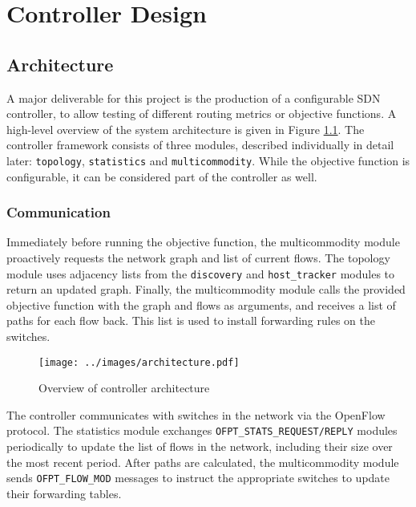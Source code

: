 \chapter{Controller Design}

\section{Architecture}
A major deliverable for this project is the production of a configurable SDN controller, to allow testing of different routing metrics or objective functions. A high-level overview of the system architecture is given in Figure \ref{fig:arch}. The controller framework consists of three modules, described individually in detail later: \texttt{topology}, \texttt{statistics} and \texttt{multicommodity}. While the objective function is configurable, it can be considered part of the controller as well.

\subsection{Communication}
Immediately before running the objective function, the multicommodity module proactively requests the network graph and list of current flows. The topology module uses adjacency lists from the \texttt{discovery} and \texttt{host\_tracker} modules to return an updated graph. Finally, the multicommodity module calls the provided objective function with the graph and flows as arguments, and receives a list of paths for each flow back. This list is used to install forwarding rules on the switches.

\begin{landscape}
\begin{figure}[h]
  \centering
  \texttt{[image: ../images/architecture.pdf]}
  \caption{Overview of controller architecture}
  \label{fig:arch}
\end{figure}
\end{landscape}

The controller communicates with switches in the network via the OpenFlow protocol. The statistics module exchanges \texttt{OFPT\_STATS\_REQUEST/REPLY} modules periodically to update the list of flows in the network, including their size over the most recent period. After paths are calculated, the multicommodity module sends \texttt{OFPT\_FLOW\_MOD} messages to instruct the appropriate switches to update their forwarding tables. 

